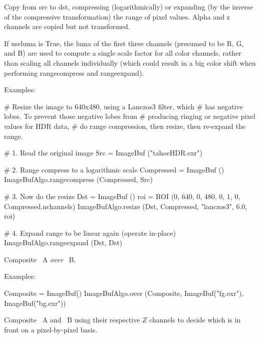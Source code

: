 Copy from {\cf src} to {\cf dst}, compressing (logarithmically) or expanding
(by the inverse of the compressive transformation) the range of pixel
values.  Alpha and z channels are copied but not transformed.

If {\cf useluma} is {\cf True}, the luma of the first three channels (presumed
to be R, G, and B) are used to compute a single scale factor for all
color channels, rather than scaling all channels individually (which
could result in a big color shift when performing {\cf rangecompress}
and {\cf rangeexpand}).

\smallskip
\noindent Examples:
\begin{code}
    # Resize the image to 640x480, using a Lanczos3 filter, which
    # has negative lobes. To prevent those negative lobes from
    # producing ringing or negative pixel values for HDR data,
    # do range compression, then resize, then re-expand the range.

    # 1. Read the original image
    Src = ImageBuf ("tahoeHDR.exr")

    # 2. Range compress to a logarithmic scale
    Compressed = ImageBuf ()
    ImageBufAlgo.rangecompress (Compressed, Src)

    # 3. Now do the resize
    Dst = ImageBuf ()
    roi = ROI (0, 640, 0, 480, 0, 1, 0, Compressed.nchannels)
    ImageBufAlgo.resize (Dst, Compressed, "lanczos3", 6.0, roi)

    # 4. Expand range to be linear again (operate in-place)
    ImageBufAlgo.rangeexpand (Dst, Dst)
\end{code}
\apiend


 

Composite \ImageBuf\ {\cf A} \emph{over} \ImageBuf\ {\cf B}.

\smallskip
\noindent Examples:
\begin{code}
    Composite = ImageBuf()
    ImageBufAlgo.over (Composite, ImageBuf("fg.exr"), ImageBuf("bg.exr"))
\end{code}
\apiend


 

Composite \ImageBuf\ {\cf A} and \ImageBuf\ {\cf B} using their respective
$Z$ channels to decide which is in front on a pixel-by-pixel basis.

